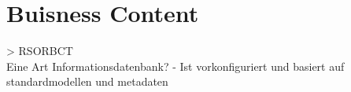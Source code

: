 \chapter{Buisness Content}
> RSORBCT\\
Eine Art Informationsdatenbank?
- Ist vorkonfiguriert und basiert auf standardmodellen und metadaten
